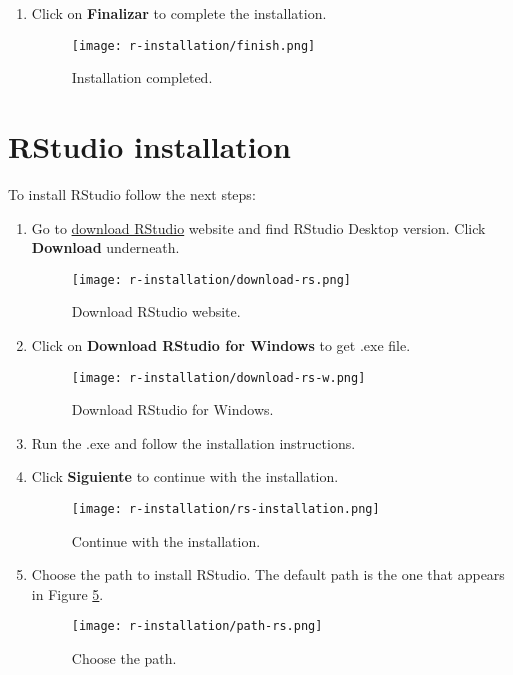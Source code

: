 \begin{enumerate}
    \item Click on \textbf{Finalizar} to complete the installation.
        \begin{figure}[H]
            \centering
            \texttt{[image: r-installation/finish.png]}
            \caption{Installation completed.}
            \label{fig:finish}
        \end{figure}
\end{enumerate}

\section{RStudio installation}

To install RStudio follow the next steps:

\begin{enumerate}
    \item Go to \href{https://www.rstudio.com/products/rstudio/download/}{download RStudio} website and find RStudio Desktop version. Click \textbf{Download} underneath.
        \begin{figure}[H]
            \centering
            \texttt{[image: r-installation/download-rs.png]}
            \caption{Download RStudio website.}
            \label{fig:download-rs}
        \end{figure}
    
    \item Click on \textbf{Download RStudio for Windows} to get .exe file.
        \begin{figure}[H]
            \centering
            \texttt{[image: r-installation/download-rs-w.png]}
            \caption{Download RStudio for Windows.}
            \label{fig:download-rs-w}
        \end{figure}
    
    \item Run the .exe and follow the installation instructions.
    
    \item Click \textbf{Siguiente} to continue with the installation.
        \begin{figure}[H]
            \centering
            \texttt{[image: r-installation/rs-installation.png]}
            \caption{Continue with the installation.}
            \label{fig:rs-installation}
        \end{figure}
    
    \item Choose the path to install RStudio. The default path is the one that appears in Figure \ref{fig:path-rs}.
        \begin{figure}[H]
            \centering
            \texttt{[image: r-installation/path-rs.png]}
            \caption{Choose the path.}
            \label{fig:path-rs}
        \end{figure}
    

\end{enumerate}
